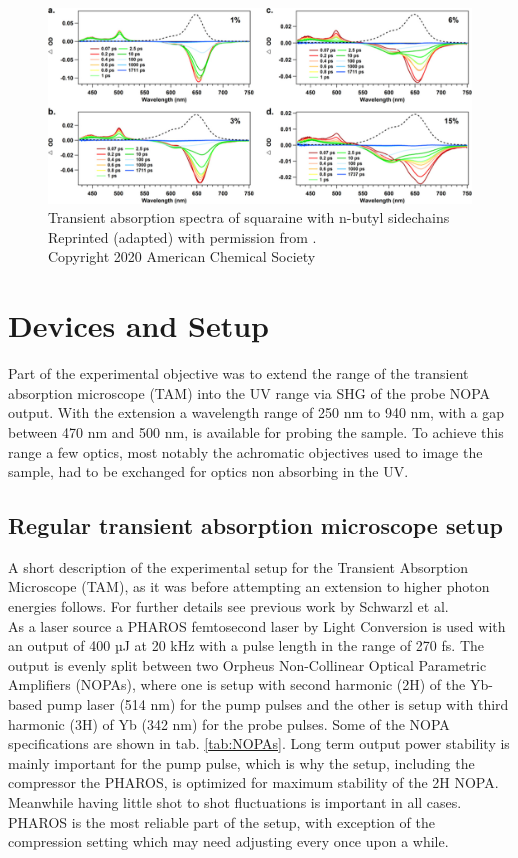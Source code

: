 \documentclass[twoside,openright]{scrreprt}
\begin{document}
\begin{figure}[hbtp]
\centering
\includegraphics[scale=1]{images/Zheng2020SquaraineTAgraph.jpeg}
\caption{Transient absorption spectra of squaraine with n-butyl sidechains\\
Reprinted (adapted) with permission from \protect{}. \\Copyright 2020 American Chemical Society}
\end{figure}


\chapter{Devices and Setup}

Part of the experimental objective was to extend the range of the transient absorption microscope (TAM) into the UV range via SHG of the probe NOPA output. With the extension a wavelength range of 250 nm to 940 nm, with a gap between 470 nm and 500 nm, is available for probing the sample.\newline
To achieve this range a few optics, most notably the achromatic objectives used to image the sample, had to be exchanged for optics non absorbing in the UV.
\section{Regular transient absorption microscope setup}\label{RegTAM}
A short description of the experimental setup for the Transient Absorption Microscope (TAM), as it was before attempting an extension to higher photon energies follows. For further details see previous work by Schwarzl et al.\cite{Schwarzl2022}\\
As a laser source a PHAROS femtosecond laser by Light Conversion is used with an output of 400 µJ at 20 kHz with a pulse length in the range of 270 fs. The output is evenly split between two Orpheus Non-Collinear Optical Parametric Amplifiers (NOPAs), where one is setup with second harmonic (2H) of the Yb-based pump laser (514 nm) for the pump pulses and the other is setup with third harmonic (3H) of Yb (342 nm) for the probe pulses. Some of the NOPA specifications are shown in tab. \ref{tab:NOPAs}. Long term output power stability is mainly important for the pump pulse, which is why the setup, including the compressor the PHAROS, is optimized for maximum stability of the 2H NOPA. Meanwhile having little shot to shot fluctuations is important in all cases. PHAROS is the most reliable part of the setup, with exception of the compression setting which may need adjusting every once upon a while.\\
\end{document}
